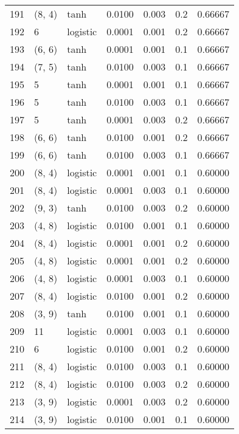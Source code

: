 \begin{tabular}{lllrrrr}
191 &      (8, 4) &      tanh &  0.0100 &  0.003 &  0.2 &   0.66667 \\
192 &           6 &  logistic &  0.0001 &  0.001 &  0.2 &   0.66667 \\
193 &      (6, 6) &      tanh &  0.0001 &  0.001 &  0.1 &   0.66667 \\
194 &      (7, 5) &      tanh &  0.0100 &  0.003 &  0.1 &   0.66667 \\
195 &           5 &      tanh &  0.0001 &  0.001 &  0.1 &   0.66667 \\
196 &           5 &      tanh &  0.0100 &  0.003 &  0.1 &   0.66667 \\
197 &           5 &      tanh &  0.0001 &  0.003 &  0.2 &   0.66667 \\
198 &      (6, 6) &      tanh &  0.0100 &  0.001 &  0.2 &   0.66667 \\
199 &      (6, 6) &      tanh &  0.0100 &  0.003 &  0.1 &   0.66667 \\
200 &      (8, 4) &  logistic &  0.0001 &  0.001 &  0.1 &   0.60000 \\
201 &      (8, 4) &  logistic &  0.0001 &  0.003 &  0.1 &   0.60000 \\
202 &      (9, 3) &      tanh &  0.0100 &  0.003 &  0.2 &   0.60000 \\
203 &      (4, 8) &  logistic &  0.0100 &  0.001 &  0.1 &   0.60000 \\
204 &      (8, 4) &  logistic &  0.0001 &  0.001 &  0.2 &   0.60000 \\
205 &      (4, 8) &  logistic &  0.0001 &  0.001 &  0.2 &   0.60000 \\
206 &      (4, 8) &  logistic &  0.0001 &  0.003 &  0.1 &   0.60000 \\
207 &      (8, 4) &  logistic &  0.0100 &  0.001 &  0.2 &   0.60000 \\
208 &      (3, 9) &      tanh &  0.0100 &  0.001 &  0.1 &   0.60000 \\
209 &          11 &  logistic &  0.0001 &  0.003 &  0.1 &   0.60000 \\
210 &           6 &  logistic &  0.0100 &  0.001 &  0.2 &   0.60000 \\
211 &      (8, 4) &  logistic &  0.0100 &  0.003 &  0.1 &   0.60000 \\
212 &      (8, 4) &  logistic &  0.0100 &  0.003 &  0.2 &   0.60000 \\
213 &      (3, 9) &  logistic &  0.0001 &  0.003 &  0.2 &   0.60000 \\
214 &      (3, 9) &  logistic &  0.0100 &  0.001 &  0.1 &   0.60000 \\

\end{tabular}
